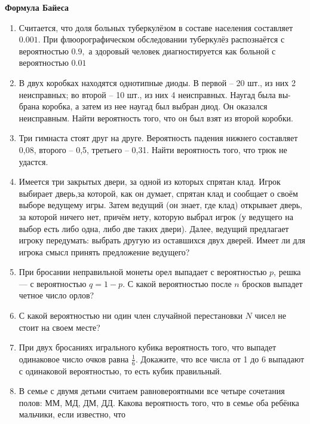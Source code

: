 \documentclass{article}
\begin{document}
\large
	
\begin{center}
	\textbf{Формула Байеса}
\end{center}


\begin{enumerate}[label*=\protect\fbox{\arabic{enumi}}]
	
\item Считается, что доля больных туберкулёзом в составе населения составляет $0.001$. При флюорографическом обследовании туберкулёз распознаётся с вероятностью $0.9,$ а здоровый человек диагностируется как больной с вероятностью $0.01$

\item В двух коробках находятся однотипные диоды. В первой – 20 шт., из них 2 неисправных; во второй – 10 шт., из них 4 неисправных. Наугад была вы- брана коробка, а затем из нее наугад был выбран диод. Он оказался неисправным. Найти вероятность того, что он был взят из второй коробки.

\item Три гимнаста стоят друг на друге. Вероятность падения нижнего составляет 0,08, второго – 0,5, третьего – 0,31. Найти вероятность того, что трюк
не удастся.

\item Имеется три закрытых двери, за одной из которых спрятан клад. Игрок выбирает дверь,за которой, как он думает, спрятан клад и сообщает о своём выборе ведущему игры. Затем ведущий (он знает, где клад) открывает дверь, за которой ничего нет, причём нету, которую выбрал игрок (у ведущего на выбор есть либо одна, либо две таких двери). Далее, ведущий предлагает игроку передумать: выбрать другую из оставшихся двух дверей. Имеет ли для игрока смысл принять предложение ведущего?

\item При бросании неправильной монеты орел выпадает с вероятностью $p$, решка — с вероятностью $q= 1-p$. С какой вероятностью после $n$ бросков выпадет четное число орлов?

\item С какой вероятностью ни один член случайной перестановки $N$ чисел не стоит на своем месте?

\item При двух бросаниях игрального кубика вероятность того, что выпадет одинаковое число очков равна $\frac{1}{6}.$ Докажите, что все числа от 1 до 6 выпадают с одинаковой вероятностью, то есть кубик правильный.

\item В семье с двумя детьми считаем равновероятными все четыре сочетания полов: ММ, МД, ДМ, ДД. Какова вероятность того, что в семье оба ребёнка мальчики, если известно, что 


\end{enumerate}
\end{document}
